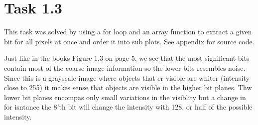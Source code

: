 \section{Task 1.3}

This task was solved by using a for loop and an array function to extract a
given bit for all pixels at once and order it into sub plots. See appendix for
source code.


Just like in the books Figure 1.3 on page 5, we see that the most significant
bits contain most of the coarse image information so the lower bits resembles
noise. Since this is a grayscale image where objects that er visible are whiter
(intensity close to 255) it makes sense that objects are visible in the higher
bit planes. Thw lower bit planes encompas only small variations in the visiblity
but a change in for isntance the 8'th bit will change the intensity with 128, or
half of the possible intensity.
